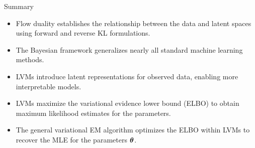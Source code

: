 \documentclass{beamer}
\begin{document}
\begin{frame}{Summary}
	\begin{itemize}
		\item Flow duality establishes the relationship between the data and latent spaces using forward and reverse KL formulations.
		\vfill
		\item The Bayesian framework generalizes nearly all standard machine learning methods.
		\vfill
		\item LVMs introduce latent representations for observed data, enabling more interpretable models.
		\vfill
		\item LVMs maximize the variational evidence lower bound (ELBO) to obtain maximum likelihood estimates for the parameters.
		\vfill
		\item The general variational EM algorithm optimizes the ELBO within LVMs to recover the MLE for the parameters $\boldsymbol{\theta}$.
	\end{itemize}
\end{frame}
\end{document}

